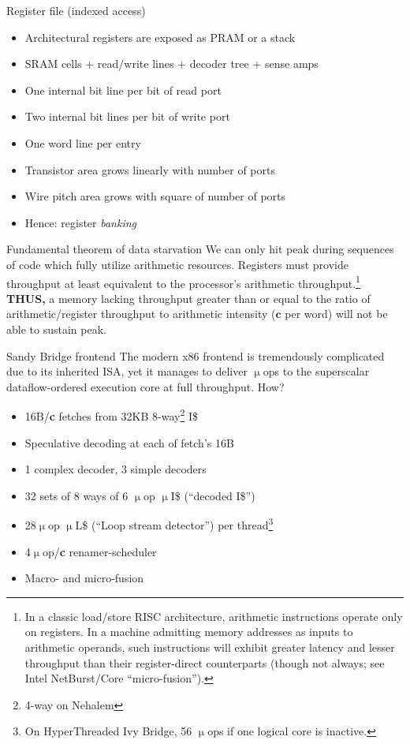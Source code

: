\documentclass[mathserif,xcolor={dvipsnames,table}]{beamer}
\begin{document}
\begin{frame}{Register file (indexed access)}
\begin{itemize}
\item Architectural registers are exposed as PRAM or a stack
\item SRAM cells + read/write lines + decoder tree + sense amps
\item One internal bit line per bit of read port
\item Two internal bit lines per bit of write port
\item One word line per entry
\item Transistor area grows linearly with number of ports
\item Wire pitch area grows with square of number of ports
\item Hence: register \textit{banking}
\end{itemize}
\end{frame}

\begin{frame}{Fundamental theorem of data starvation}
We can only hit peak during sequences of code which fully
utilize arithmetic resources. Registers must provide throughput
at least equivalent to the processor's arithmetic throughput.\footnote{\tiny{In a classic load/store RISC architecture, arithmetic instructions operate
only on registers. In a machine admitting memory addresses as inputs to
arithmetic operands, such instructions will exhibit greater latency and lesser throughput
than their register-direct counterparts (though not always; see Intel NetBurst/Core ``micro-fusion'').}}\\
\vspace{.35in}
\textbf{THUS,} a memory lacking throughput greater than or equal to the ratio of
arithmetic/register throughput to arithmetic intensity ($\textbf{c}$ per word) will not be able
to sustain peak.
\end{frame}

\begin{frame}{Sandy Bridge frontend}
The modern x86 frontend is tremendously complicated due to its inherited ISA,
yet it manages to deliver $\upmu$ops to the superscalar dataflow-ordered
execution core at full throughput. How?
\vfill
\begin{itemize}
\item 16B/\textbf{c} fetches from 32KB 8-way\footnote{4-way on Nehalem} I\$
\item Speculative decoding at each of fetch's 16B
\item 1 complex decoder, 3 simple decoders
\item 32 sets of 8 ways of 6 $\upmu$op $\upmu$I\$ (``decoded I\$'')
\item 28$\upmu$op $\upmu$L\$ (``Loop stream detector'') per thread\footnote{On HyperThreaded Ivy Bridge, 56 $\upmu$ops if one logical core is inactive.}
\item 4$\upmu$op/\textbf{c} renamer-scheduler
\item Macro- and micro-fusion
\end{itemize}
\end{frame}
\end{document}
